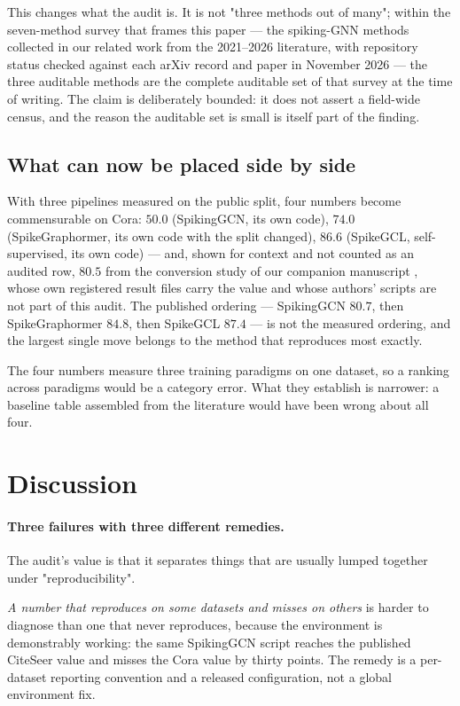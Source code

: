 \documentclass[10pt,twocolumn]{article}
\begin{document}
This changes what the audit is. It is not "three methods out of many"; within the seven-method
survey that frames this paper --- the spiking-GNN methods collected in our related work from the
2021--2026 literature, with repository status checked against each arXiv record and paper in
November 2026 --- the three auditable methods are the complete auditable set of that survey at the
time of writing. The claim is deliberately bounded: it does not assert a field-wide census, and the
reason the auditable set is small is itself part of the finding.

\subsection{What can now be placed side by side}

With three pipelines measured on the public split, four numbers become commensurable on Cora:
$50.0$ (SpikingGCN, its own code), $74.0$ (SpikeGraphormer, its own code with the split changed),
$86.6$ (SpikeGCL, self-supervised, its own code) --- and, shown for context and not counted as an
audited row, $80.5$ from the conversion study of our companion manuscript \citep{companion}, whose
own registered result files carry the value and whose authors' scripts are not part of this audit.
The published ordering --- SpikingGCN $80.7$, then SpikeGraphormer
$84.8$, then SpikeGCL $87.4$ --- is not the measured ordering, and the largest single move belongs to
the method that reproduces most exactly.

The four numbers measure three training paradigms on one dataset, so a ranking across paradigms
would be a category error. What they establish is narrower: a baseline table assembled from the
literature would have been wrong about all four.
\section{Discussion}
\label{sec:discussion}

\paragraph{Three failures with three different remedies.} The audit's value is that it separates
things that are usually lumped together under "reproducibility".

\emph{A number that reproduces on some datasets and misses on others} is harder to diagnose than one
that never reproduces, because the environment is demonstrably working: the same SpikingGCN script
reaches the published CiteSeer value and misses the Cora value by thirty points. The remedy is a
per-dataset reporting convention and a released configuration, not a global environment fix.
\end{document}
